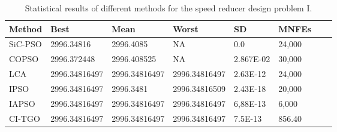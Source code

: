 
\begin{table*}[tp]
    \tiny
    \begin{center}
    
    \begin{tabular}{ P{2.0cm} P{2.0cm} P{2.0cm} P{2.0cm} P{2.0cm} P{2.0cm} P{2.0cm} P{2.0cm}  }
    \hline
    \textbf{Method} & \textbf{Best} & \textbf{Mean} & \textbf{Worst} & \textbf{SD} & \textbf{MNFEs} \\
    \hline
    
    SiC-PSO & 2996.34816 & 2996.4085 & NA & 0.0 & 24,000 \\
    COPSO & 2996.372448 & 2996.408525 & NA & 2.867E-02 & 30,000 \\
    LCA & 2996.34816497 & 2996.34816497 & 2996.34816497 & 2.63E-12 & 24,000 \\
    IPSO & 2996.34816497 & 2996.3481 & 2996.34816509 & 2.43E-18 & 20,000 \\
    IAPSO & 2996.34816497 & 2996.34816497 & 2996.34816497 & 6,88E-13 & 6,000 \\
    CI-TGO & 2996.34816497 & 2996.34816497 & 2996.34816497 & 7.5E-13 & 856.40 \\
        
    \hline
    \end{tabular}
    \end{center}
    
    \caption{ Statistical results of different methods for the speed reducer design problem I. \\[1em]}
    \label{tab:SP1}
    \end{table*}
    
    